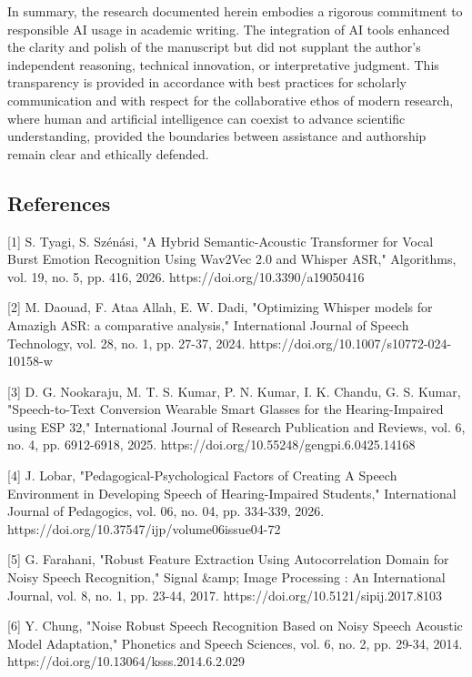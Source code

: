 \documentclass[12pt,a4paper]{article}
\begin{document}
In summary, the research documented herein embodies a rigorous commitment to responsible AI usage in academic writing. The integration of AI tools enhanced the clarity and polish of the manuscript but did not supplant the author’s independent reasoning, technical innovation, or interpretative judgment. This transparency is provided in accordance with best practices for scholarly communication and with respect for the collaborative ethos of modern research, where human and artificial intelligence can coexist to advance scientific understanding, provided the boundaries between assistance and authorship remain clear and ethically defended.




\subsection{References}


[1] S. Tyagi, S. Szénási, "A Hybrid Semantic-Acoustic Transformer for Vocal Burst Emotion Recognition Using Wav2Vec 2.0 and Whisper ASR," Algorithms, vol. 19, no. 5, pp. 416, 2026. https://doi.org/10.3390/a19050416


[2] M. Daouad, F. Ataa Allah, E. W. Dadi, "Optimizing Whisper models for Amazigh ASR: a comparative analysis," International Journal of Speech Technology, vol. 28, no. 1, pp. 27-37, 2024. https://doi.org/10.1007/s10772-024-10158-w


[3] D. G. Nookaraju, M. T. S. Kumar, P. N. Kumar, I. K. Chandu, G. S. Kumar, "Speech-to-Text Conversion Wearable Smart Glasses for the Hearing-Impaired using ESP 32," International Journal of Research Publication and Reviews, vol. 6, no. 4, pp. 6912-6918, 2025. https://doi.org/10.55248/gengpi.6.0425.14168


[4] J. Lobar, "Pedagogical-Psychological Factors of Creating A Speech Environment in Developing Speech of Hearing-Impaired Students," International Journal of Pedagogics, vol. 06, no. 04, pp. 334-339, 2026. https://doi.org/10.37547/ijp/volume06issue04-72


[5] G. Farahani, "Robust Feature Extraction Using Autocorrelation Domain for Noisy Speech Recognition," Signal \&amp; Image Processing : An International Journal, vol. 8, no. 1, pp. 23-44, 2017. https://doi.org/10.5121/sipij.2017.8103


[6] Y. Chung, "Noise Robust Speech Recognition Based on Noisy Speech Acoustic Model Adaptation," Phonetics and Speech Sciences, vol. 6, no. 2, pp. 29-34, 2014. https://doi.org/10.13064/ksss.2014.6.2.029
\end{document}
